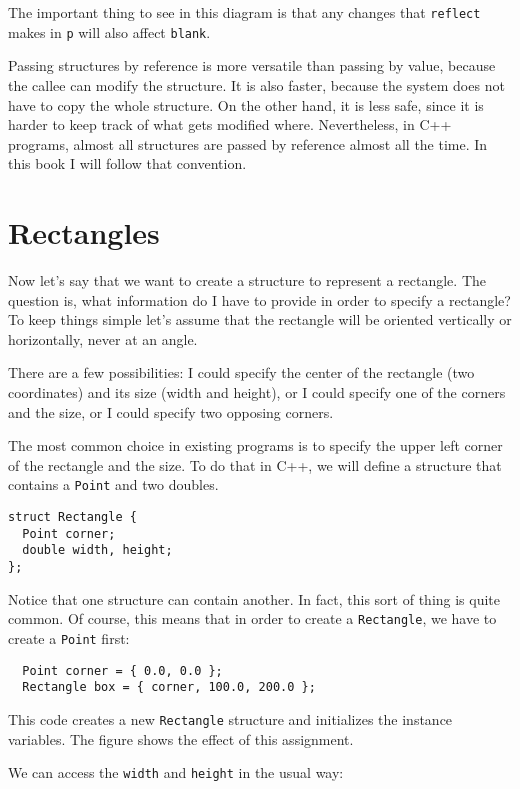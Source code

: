 The important thing to see in this diagram is that any changes that
{\tt reflect} makes in {\tt p} will also affect {\tt blank}.

Passing structures by reference is more versatile than passing by
value, because the callee can modify the structure.  It is also
faster, because the system does not have to copy the whole
structure.  On the other hand, it is less safe, since it is harder to
keep track of what gets modified where.  Nevertheless, in C++
programs, almost all structures are passed by reference almost all the
time.  In this book I will follow that convention.


\section{Rectangles}

Now let's say that we want to create a structure to represent
a rectangle.  The question is, what information do I have to
provide in order to specify a rectangle?  To keep things simple
let's assume that the rectangle will be oriented vertically or
horizontally, never at an angle.

There are a few possibilities: I could specify the center of
the rectangle (two coordinates) and its size (width and height),
or I could specify one of the corners and the size, or I
could specify two opposing corners.

The most common choice in existing programs is to specify the
upper left corner of the rectangle and the size.  To do that
in C++, we will define a structure that contains a {\tt Point}
and two doubles.

\begin{verbatim}
struct Rectangle {
  Point corner;
  double width, height;
};  
\end{verbatim}
%
Notice that one structure can contain another.  In fact, this
sort of thing is quite common.  Of course, this means that in
order to create a {\tt Rectangle}, we have to create a {\tt Point}
first:

\begin{verbatim}
  Point corner = { 0.0, 0.0 };
  Rectangle box = { corner, 100.0, 200.0 };
\end{verbatim}
%
This code creates a new {\tt Rectangle} structure and initializes the
instance variables.  The figure shows the effect of this assignment.

\vspace{0.1in}
\centerline{}
\vspace{0.1in}
%
We can access the {\tt width} and {\tt height} in the usual way:

